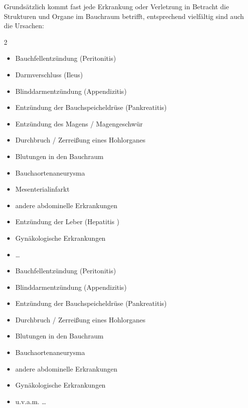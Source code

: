 {%
Grundsätzlich kommt fast jede Erkrankung oder Verletzung in
Betracht die Strukturen und Organe im Bauchraum betrifft,
entsprechend vielfältig sind auch die Ursachen: 

\begin{multicols}{2}
\begin{itemize}
  \item Bauchfellentzündung (Peritonitis)
  \item Darmverschluss (Ileus)
  \item Blinddarmentzündung (Appendizitis)
  \item Entzündung der Bauchspeicheldrüse  (Pankreatitis)
  \item Entzündung des Magens / Magengeschwür
  \item Durchbruch / Zerreißung eines Hohlorganes
  \item Blutungen in den Bauchraum
  \item Bauchaortenaneurysma
  \item Mesenterialinfarkt
  \item andere abdominelle Erkrankungen
  \item Entzündung der Leber (Hepatitis )
  \item Gynäkologische Erkrankungen
  \item \ldots
\end{itemize}
\end{multicols}
}{
\begin{itemize}
  \item Bauchfellentzündung (Peritonitis)
  \item Blinddarmentzündung (Appendizitis)
  \item Entzündung der Bauchspeicheldrüse  (Pankreatitis)
  \item Durchbruch / Zerreißung eines Hohlorganes
  \item Blutungen in den Bauchraum
  \item Bauchaortenaneurysma
  \item andere abdominelle Erkrankungen
  \item Gynäkologische Erkrankungen
  \item u.v.a.m. \ldots
\end{itemize}
}{}{}{}





